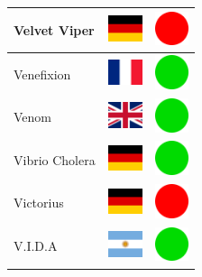 \documentclass[12pt, a4paper, twoside]{report}
\begin{document}
\begin{center}
\begin{longtable}{|p{5cm}|p{2cm}|p{2cm}|}
 Velvet Viper                                               & \includegraphics[width=1cm]{4x3/de} &   \includegraphics[width=1cm]{likes/n} \\ \hline
 Venefixion                                                 & \includegraphics[width=1cm]{4x3/fr} &   \includegraphics[width=1cm]{likes/y} \\ \hline
 Venom                                                      & \includegraphics[width=1cm]{4x3/gb} &   \includegraphics[width=1cm]{likes/y} \\ \hline
 Vibrio Cholera                                             & \includegraphics[width=1cm]{4x3/de} &   \includegraphics[width=1cm]{likes/y} \\ \hline
 Victorius                                                  & \includegraphics[width=1cm]{4x3/de} &   \includegraphics[width=1cm]{likes/n} \\ \hline
 V.I.D.A                                                    & \includegraphics[width=1cm]{4x3/ar} &   \includegraphics[width=1cm]{likes/y} \\ \hline

\end{longtable}
\end{center}
\end{document}
